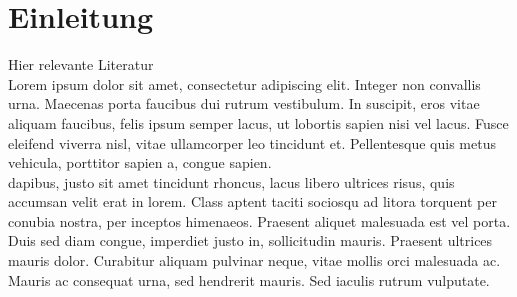 \section{Einleitung}
Hier relevante Literatur\\

\cite{doi:10.1080/01441647.2018.1494640} Lorem ipsum dolor sit amet, consectetur adipiscing elit. Integer non convallis urna. Maecenas porta faucibus dui rutrum vestibulum. In suscipit, eros vitae aliquam faucibus, felis ipsum semper lacus, ut lobortis sapien nisi vel lacus. Fusce eleifend viverra nisl, vitae ullamcorper leo tincidunt et. Pellentesque quis metus vehicula, porttitor sapien a, congue sapien.\\

\cite{smith2015automated, stocker2017} dapibus, justo sit amet tincidunt rhoncus, lacus libero ultrices risus, quis accumsan velit erat in lorem. Class aptent taciti sociosqu ad litora torquent per conubia nostra, per inceptos himenaeos. Praesent aliquet malesuada est vel porta. Duis sed diam congue, imperdiet justo in, sollicitudin mauris. Praesent ultrices mauris dolor. Curabitur aliquam pulvinar neque, vitae mollis orci malesuada ac. Mauris ac consequat urna, sed hendrerit mauris. Sed iaculis rutrum vulputate. 
